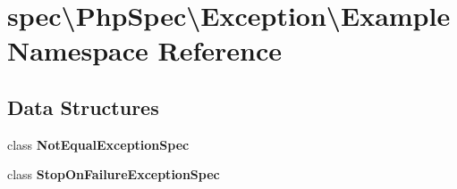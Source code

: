 \section{spec\textbackslash{}Php\+Spec\textbackslash{}Exception\textbackslash{}Example Namespace Reference}
\label{namespacespec_1_1_php_spec_1_1_exception_1_1_example}
\subsection*{Data Structures}
\begin{DoxyCompactItemize}
\item 
class {\bf Not\+Equal\+Exception\+Spec}
\item 
class {\bf Stop\+On\+Failure\+Exception\+Spec}
\end{DoxyCompactItemize}
